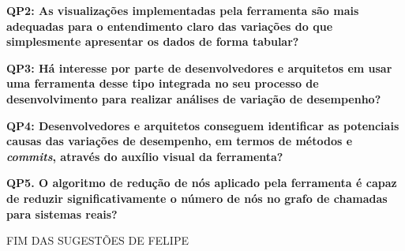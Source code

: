 \textbf{QP2: As visualizações implementadas pela ferramenta são mais adequadas para o entendimento claro das variações do que simplesmente apresentar os dados de forma tabular?}

\textbf{QP3: Há interesse por parte de desenvolvedores e arquitetos em usar uma ferramenta desse tipo integrada no seu processo de desenvolvimento para realizar análises de variação de desempenho?}

\textbf{QP4: Desenvolvedores e arquitetos conseguem identificar as potenciais causas das variações de desempenho, em termos de métodos e \textit{commits}, através do auxílio visual da ferramenta?}

\textbf{QP5. O algoritmo de redução de nós aplicado pela ferramenta é capaz de reduzir significativamente o número de nós no grafo de chamadas para sistemas reais?}

{\color{red}FIM DAS SUGESTÕES DE FELIPE}




